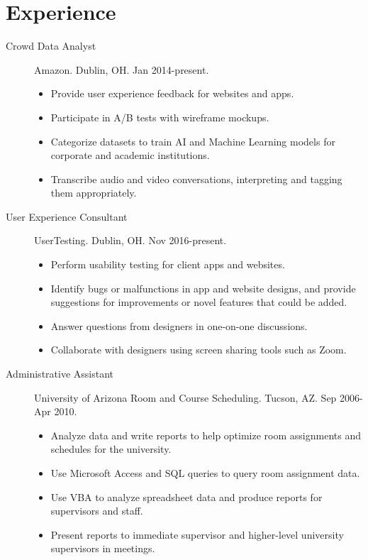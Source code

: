 \documentclass{article}
\begin{document}
\vspace{-1em}
\section*{Experience}\vspace{-0.5em}

\begin{description}
  \item[Crowd Data Analyst] Amazon. Dublin, OH. Jan 2014-present.
  \begin{itemize}
    \item Provide user experience feedback for websites and apps.
    \item Participate in A/B tests with wireframe mockups.
    \item Categorize datasets to train AI and Machine Learning models for corporate and academic institutions.
    \item Transcribe audio and video conversations, interpreting and tagging them appropriately.
  \end{itemize}
  \item[User Experience Consultant] UserTesting. Dublin, OH. Nov 2016-present.
  \begin{itemize}
    \item Perform usability testing for client apps and websites.
    \item Identify bugs or malfunctions in app and website designs, and provide suggestions for improvements or novel features that could be added.
    \item Answer questions from designers in one-on-one discussions.
    \item Collaborate with designers using screen sharing tools such as Zoom.
  \end{itemize}  
  \item[Administrative Assistant] University of Arizona Room and Course Scheduling. Tucson, AZ. Sep 2006-Apr 2010.
  \begin{itemize}
    \item Analyze data and write reports to help optimize room assignments and schedules for the university.
    \item Use Microsoft Access and SQL queries to query room assignment data.
    \item Use VBA to analyze spreadsheet data and produce reports for supervisors and staff.
    \item Present reports to immediate supervisor and higher-level university supervisors in meetings.
  \end{itemize}
\end{description}
\end{document}
